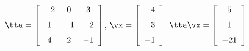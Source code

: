 {$\tta = \left[ \begin {array}{ccc} -2&0&3\\\noalign{\medskip}1&-1&-2
\\\noalign{\medskip}4&2&-1\end {array} \right]$,\quad  
$\vx = \left[ \begin {array}{c} -4\\\noalign{\medskip}-3\\\noalign{\medskip}
-1\end {array} \right] $}
{$\tta\vx= \left[ \begin {array}{c} 5\\\noalign{\medskip}1\\\noalign{\medskip}-
21\end {array} \right] $
}
 
 

 

 

